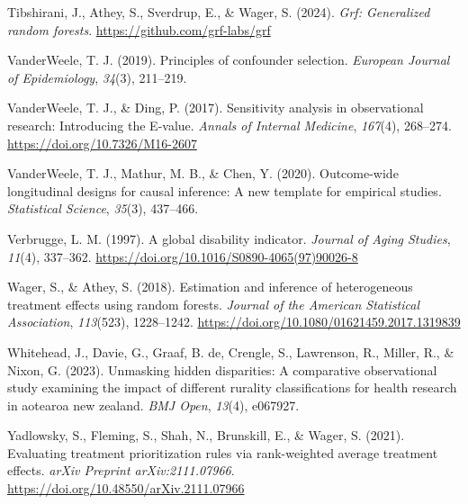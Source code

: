 \documentclass[
  single column]{article}
\newlength{\cslhangindent}
\newenvironment{CSLReferences}[2] %
 {\begin{list}{}{%
  \setlength{\itemindent}{0pt}
  \setlength{\leftmargin}{0pt}
  \setlength{\parsep}{0pt}
  \ifodd #1
   \setlength{\leftmargin}{\cslhangindent}
   \setlength{\itemindent}{-1\cslhangindent}
  \fi
  \setlength{\itemsep}{#2\baselineskip}}}
 {\end{list}}
\begin{document}
\begin{CSLReferences}{1}{0}
Tibshirani, J., Athey, S., Sverdrup, E., \& Wager, S. (2024). \emph{Grf:
Generalized random forests}. \url{https://github.com/grf-labs/grf}

VanderWeele, T. J. (2019). Principles of confounder selection.
\emph{European Journal of Epidemiology}, \emph{34}(3), 211--219.

VanderWeele, T. J., \& Ding, P. (2017). Sensitivity analysis in
observational research: Introducing the {E}-value. \emph{Annals of
Internal Medicine}, \emph{167}(4), 268--274.
\url{https://doi.org/10.7326/M16-2607}

VanderWeele, T. J., Mathur, M. B., \& Chen, Y. (2020). Outcome-wide
longitudinal designs for causal inference: A new template for empirical
studies. \emph{Statistical Science}, \emph{35}(3), 437--466.

Verbrugge, L. M. (1997). A global disability indicator. \emph{Journal of
Aging Studies}, \emph{11}(4), 337--362.
\url{https://doi.org/10.1016/S0890-4065(97)90026-8}

Wager, S., \& Athey, S. (2018). Estimation and inference of
heterogeneous treatment effects using random forests. \emph{Journal of
the American Statistical Association}, \emph{113}(523), 1228--1242.
\url{https://doi.org/10.1080/01621459.2017.1319839}

Whitehead, J., Davie, G., Graaf, B. de, Crengle, S., Lawrenson, R.,
Miller, R., \& Nixon, G. (2023). Unmasking hidden disparities: A
comparative observational study examining the impact of different
rurality classifications for health research in aotearoa new zealand.
\emph{BMJ Open}, \emph{13}(4), e067927.

Yadlowsky, S., Fleming, S., Shah, N., Brunskill, E., \& Wager, S.
(2021). Evaluating treatment prioritization rules via rank-weighted
average treatment effects. \emph{arXiv Preprint arXiv:2111.07966}.
\url{https://doi.org/10.48550/arXiv.2111.07966}

\end{CSLReferences}
\end{document}
